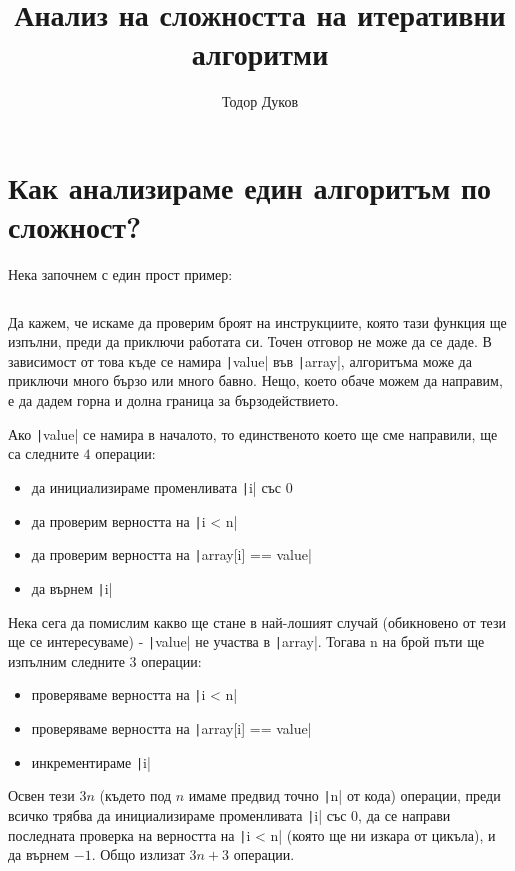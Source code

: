 \documentclass{article}
\title{Анализ на сложността на итеративни алгоритми}
\author{Тодор Дуков}
\date{}
\theoremstyle{definition}
\theoremstyle{plain}
\theoremstyle{remark}
\theoremstyle{definition}
\begin{document}
\maketitle

\section*{Как анализираме един алгоритъм по сложност?}

Нека започнем с един прост пример:

\inputminted[linenos]{c++}{algorithms/find.cpp}

Да кажем, че искаме да проверим броят на инструкциите, която тази функция ще изпълни, преди да приключи работата си.
Точен отговор не може да се даде.
В зависимост от това къде се намира \texttt|value| във \texttt|array|, алгоритъма може да приключи много бързо или много бавно.
Нещо, което обаче можем да направим, е да дадем горна и долна граница за бързодействието.

Ако \texttt|value| се намира в началото, то единственото което ще сме направили, ще са следните $4$ операции:
\begin{itemize}
    \item да инициализираме променливата \texttt|i| със $0$
    \item да проверим верността на \texttt|i < n|
    \item да проверим верността на \texttt|array[i] == value|
    \item да върнем \texttt|i|
\end{itemize}

Нека сега да помислим какво ще стане в най-лошият случай (обикновено от тези ще се интересуваме) - \texttt|value| не участва в \texttt|array|.
Тогава n на брой пъти ще изпълним следните $3$ операции:
\begin{itemize}
    \item проверяваме верността на \texttt|i < n|
    \item проверяваме верността на \texttt|array[i] == value|
    \item инкрементираме \texttt|i|
\end{itemize}
Освен тези $3n$ (където под $n$ имаме предвид точно \texttt|n| от кода) операции, преди всичко трябва да инициализираме променливата \texttt|i| със $0$, да се направи последната проверка на верността на \texttt|i < n| (която ще ни изкара от цикъла), и да върнем $-1$.
Общо излизат $3n + 3$ операции.
\end{document}
